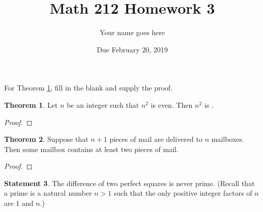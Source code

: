 \documentclass[11pt]{article}		%
\title{Math 212 Homework 3}
\author{Your name goes here}
\date{Due February 20, 2019}
\theoremstyle{definition}
\newtheorem{theorem}{Theorem}
\newtheorem{statement}[theorem]{Statement}
\begin{document}
\maketitle


\noindent For Theorem \ref{Theorem:ThisIsHowLabelsWork}, fill in the blank and supply the proof.

\begin{theorem}\label{Theorem:ThisIsHowLabelsWork}
	Let $n$ be an integer such that $n^2$ is even.
	Then $n^2$ is \makebox[0.75in]{\hrulefill}.
\end{theorem}

\begin{proof}

\end{proof}

\begin{theorem}
	Suppose that $n+1$ pieces of mail are delivered to $n$ mailboxes.
	Then some mailbox contains at least two pieces of mail. %
\end{theorem}

\begin{proof}

\end{proof}



\begin{statement} %
	The difference of two perfect squares is never prime. (Recall that a prime is a natural number $n> 1$ such that the only positive integer factors of $n$ are 1 and $n$.)
\end{statement}
\end{document}
